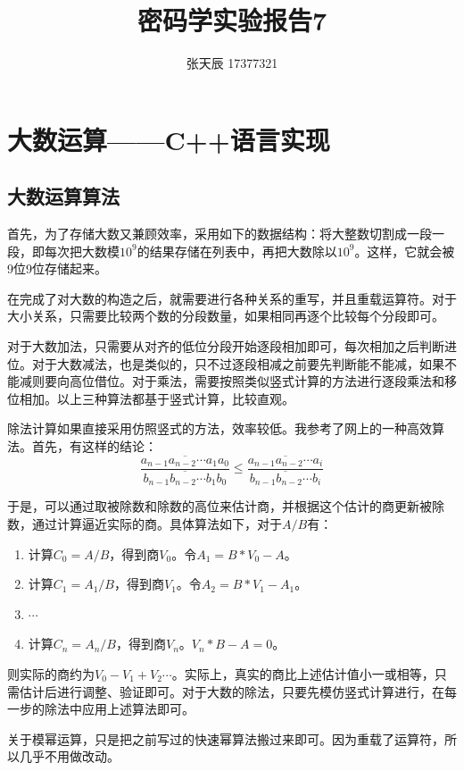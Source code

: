 \documentclass[11pt]{ctexart}
\title{密码学实验报告7}
\author{张天辰 17377321}
\begin{document}
\maketitle{}



\section{大数运算——C++语言实现}
\subsection{大数运算算法} %
首先，为了存储大数又兼顾效率，采用如下的数据结构：将大整数切割成一段一段，即每次把大数模$10^9$的结果存储在列表中，再把大数除以$10^9$。这样，它就会被9位9位存储起来。

在完成了对大数的构造之后，就需要进行各种关系的重写，并且重载运算符。对于大小关系，只需要比较两个数的分段数量，如果相同再逐个比较每个分段即可。

对于大数加法，只需要从对齐的低位分段开始逐段相加即可，每次相加之后判断进位。对于大数减法，也是类似的，只不过逐段相减之前要先判断能不能减，如果不能减则要向高位借位。对于乘法，需要按照类似竖式计算的方法进行逐段乘法和移位相加。以上三种算法都基于竖式计算，比较直观。

除法计算如果直接采用仿照竖式的方法，效率较低。我参考了网上的一种高效算法。首先，有这样的结论：
$$\frac{\overline{a_{n-1}a_{n-2}\cdots a_{1}a_{0}}}{\overline{b_{n-1}b_{n-2}\cdots b_{1}b_{0}}} \leqslant \frac{\overline{a_{n-1}a_{n-2}\cdots a_{i}}}{\overline{b_{n-1}b_{n-2}\cdots b_{i}}}$$

于是，可以通过取被除数和除数的高位来估计商，并根据这个估计的商更新被除数，通过计算逼近实际的商。具体算法如下，对于$A/B$有：
\begin{enumerate}[1]
    \item 计算$C_0 = A / B$，得到商$V_0$。令$A_1 = B * V_0 - A$。
    \item 计算$C_1 = A_1 / B$，得到商$V_1$。令$A_2 = B * V_1 - A_1$。
    \item $\cdots$
    \item 计算$C_n = A_n / B$，得到商$V_n$。$V_n * B - A = 0$。
\end{enumerate}
则实际的商约为$V_0 - V_1 + V_2 \cdots$。实际上，真实的商比上述估计值小一或相等，只需估计后进行调整、验证即可。对于大数的除法，只要先模仿竖式计算进行，在每一步的除法中应用上述算法即可。

关于模幂运算，只是把之前写过的快速幂算法搬过来即可。因为重载了运算符，所以几乎不用做改动。
\end{document}
